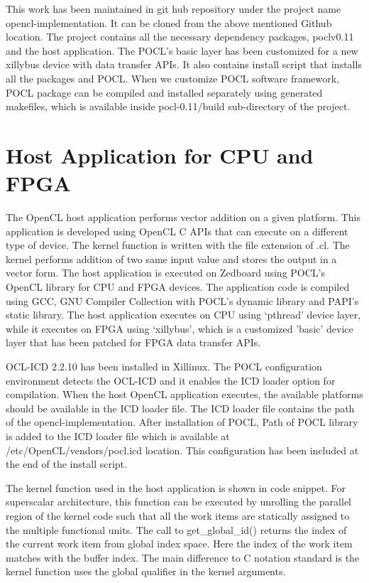 This work has been maintained in git hub repository under the project name opencl-implementation. It can be cloned from the above mentioned Github location. The project contains all the necessary dependency packages, poclv0.11 and the host application. The POCL’s basic layer has been customized for a new xillybus device with data transfer APIs. It also contains install script that installs all the packages and POCL. When we customize POCL software framework, POCL package can be compiled and installed separately using generated makefiles, which is available inside pocl-0.11/build sub-directory of the project.

\section{Host Application for CPU and FPGA}
The OpenCL host application performs vector addition on a given platform. This application is developed using OpenCL C APIs that can execute on a different type of device. The kernel function is written with the file extension of .cl. The kernel performs addition of two same input value and stores the output in a vector form. The host application is executed on Zedboard using POCL's OpenCL library for CPU and FPGA devices. The application code is compiled using GCC, GNU Compiler Collection with POCL’s dynamic library and PAPI’s static library. The host application executes on CPU using ‘pthread’ device layer, while it executes on FPGA using ‘xillybus’, which is a customized 'basic' device layer that has been patched for FPGA data transfer APIs. 
 
OCL-ICD 2.2.10 has been installed in Xillinux. The POCL configuration environment detects the OCL-ICD and it enables the ICD loader option for compilation. When the host OpenCL application executes, the available platforms should be available in the ICD loader file. The ICD loader file contains the path of the opencl-implementation. After installation of POCL, Path of POCL library is added to the ICD loader file which is available at /etc/OpenCL/vendors/pocl.icd location. This configuration has been included at the end of the install script.

The kernel function used in the host application is shown in code snippet. For superscalar architecture, this function can be executed by unrolling the parallel region of the kernel code such that all the work items are statically assigned to the multiple functional units. The call to get\_global\_id() returns the index of the current work item from global index space. Here the index of the work item matches with the buffer index. The main difference to C notation standard is the kernel function uses the global qualifier in the kernel arguments. 
	

